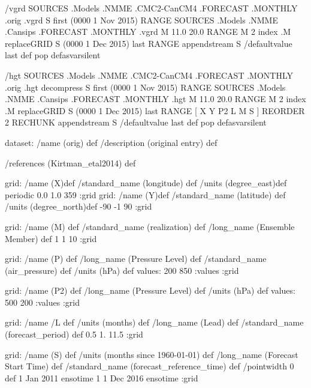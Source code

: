 \begin{ingrid}
/vgrd {
 SOURCES .Models .NMME .CMC2-CanCM4 .FORECAST .MONTHLY .orig .vgrd 
S first (0000 1 Nov 2015) RANGE
 SOURCES .Models .NMME .Cansips .FORECAST .MONTHLY .vgrd
 M 11.0 20.0 RANGE
 M 2 index .M replaceGRID
S (0000 1 Dec 2015) last RANGE
appendstream
S /defaultvalue last def pop
} defasvarsilent

/hgt {
 SOURCES .Models .NMME .CMC2-CanCM4 .FORECAST .MONTHLY .orig .hgt decompress
S first (0000 1 Nov 2015) RANGE
 SOURCES .Models .NMME .Cansips .FORECAST .MONTHLY .hgt 
 M 11.0 20.0 RANGE
 M 2 index .M replaceGRID
S (0000 1 Dec 2015) last RANGE
[ X Y P2 L M S ] REORDER
2 RECHUNK
appendstream
S /defaultvalue last def pop
} defasvarsilent


dataset:
/name (orig) def
/description (original entry) def

/references (Kirtman_etal2014) def

grid:
/name (X)def
/standard_name (longitude) def
/units (degree_east)def
periodic
 0.0 1.0 359
:grid
grid:
/name (Y)def
/standard_name (latitude) def
/units (degree_north)def
-90 -1 90
:grid

grid:
/name (M) def
/standard_name (realization) def
/long_name (Ensemble Member) def
1 1 10
:grid

grid:
/name (P) def
/long_name (Pressure Level) def
/standard_name (air_pressure) def
/units (hPa) def
values: 200 850 :values
:grid

grid:
/name (P2) def
/long_name (Pressure Level) def
/units (hPa) def
values: 500 200 :values
:grid

grid:
/name /L def
/units (months) def
/long_name (Lead) def
/standard_name (forecast_period) def
0.5 1. 11.5
:grid

grid:
/name (S) def
/units (months since 1960-01-01) def
/long_name (Forecast Start Time) def
/standard_name (forecast_reference_time) def
/pointwidth 0 def
1 Jan 2011 ensotime
1
1 Dec 2016 ensotime
:grid


%


\end{ingrid}
